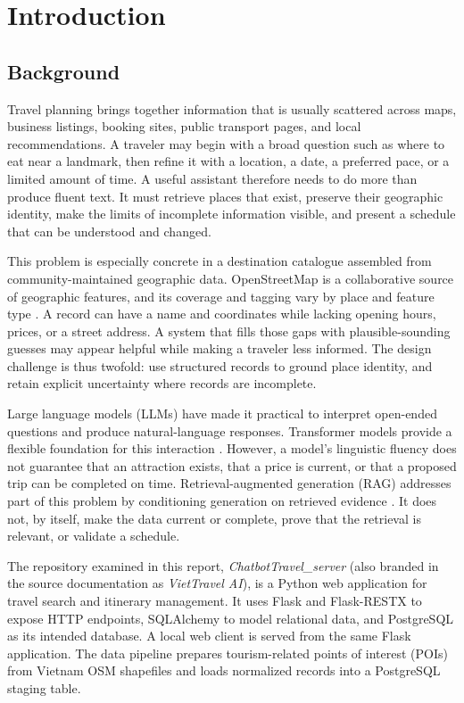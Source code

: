 \chapter{Introduction}
\label{chap:introduction}

\section{Background}

Travel planning brings together information that is usually scattered across maps, business listings, booking sites, public transport pages, and local recommendations. A traveler may begin with a broad question such as where to eat near a landmark, then refine it with a location, a date, a preferred pace, or a limited amount of time. A useful assistant therefore needs to do more than produce fluent text. It must retrieve places that exist, preserve their geographic identity, make the limits of incomplete information visible, and present a schedule that can be understood and changed.

This problem is especially concrete in a destination catalogue assembled from community-maintained geographic data. OpenStreetMap is a collaborative source of geographic features, and its coverage and tagging vary by place and feature type \cite{haklay2008openstreetmap}. A record can have a name and coordinates while lacking opening hours, prices, or a street address. A system that fills those gaps with plausible-sounding guesses may appear helpful while making a traveler less informed. The design challenge is thus twofold: use structured records to ground place identity, and retain explicit uncertainty where records are incomplete.

Large language models (LLMs) have made it practical to interpret open-ended questions and produce natural-language responses. Transformer models provide a flexible foundation for this interaction \cite{vaswani2017attention,brown2020language}. However, a model's linguistic fluency does not guarantee that an attraction exists, that a price is current, or that a proposed trip can be completed on time. Retrieval-augmented generation (RAG) addresses part of this problem by conditioning generation on retrieved evidence \cite{lewis2020retrieval,gao2023retrieval}. It does not, by itself, make the data current or complete, prove that the retrieval is relevant, or validate a schedule.

The repository examined in this report, \textit{ChatbotTravel\_server} (also branded in the source documentation as \textit{VietTravel AI}), is a Python web application for travel search and itinerary management. It uses Flask and Flask-RESTX to expose HTTP endpoints, SQLAlchemy to model relational data, and PostgreSQL as its intended database. A local web client is served from the same Flask application. The data pipeline prepares tourism-related points of interest (POIs) from Vietnam OSM shapefiles and loads normalized records into a PostgreSQL staging table.

